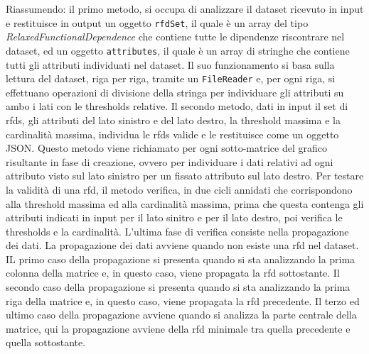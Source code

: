 Riassumendo: il primo metodo, si occupa di analizzare il dataset ricevuto in input e restituisce in output un oggetto \texttt{rfdSet}, il quale \`{e} un array del tipo \textit{RelaxedFunctionalDependence} che contiene tutte le dipendenze riscontrare nel dataset, ed un oggetto \texttt{attributes}, il quale \`{e} un array di stringhe che contiene tutti gli attributi individuati nel dataset. Il suo funzionamento si basa sulla lettura del dataset, riga per riga, tramite un \texttt{FileReader} e, per ogni riga, si effettuano operazioni di divisione della stringa per individuare gli attributi su ambo i lati con le thresholds relative. Il secondo metodo, dati in input il set di \acrshort{rfds}, gli attributi del lato sinistro e del lato destro, la threshold massima e la cardinalit\`{a} massima, individua le \acrshort{rfds} valide e le restituisce come un oggetto JSON. Questo metodo viene richiamato per ogni sotto-matrice del grafico risultante in fase di creazione, ovvero per individuare i dati relativi ad ogni attributo visto sul lato sinistro per un fissato attributo sul lato destro. Per testare la validit\`{a} di una \acrshort{rfd}, il metodo verifica, in due cicli annidati che corrispondono alla threshold massima ed alla cardinalit\`{a} massima, prima che questa contenga gli attributi indicati in input per il lato sinitro e per il lato destro, poi verifica le thresholds e la cardinalit\`{a}. L'ultima fase di verifica consiste nella propagazione dei dati. La propagazione dei dati avviene quando non esiste una \acrshort{rfd} nel dataset. IL primo caso della propagazione si presenta quando si sta analizzando la prima colonna della matrice e, in questo caso, viene propagata la \acrshort{rfd} sottostante. Il secondo caso della propagazione si presenta quando si sta analizzando la prima riga della matrice e, in questo caso, viene propagata la \acrshort{rfd} precedente. Il terzo ed ultimo caso della propagazione avviene quando si analizza la parte centrale della matrice, qui la propagazione avviene della \acrshort{rfd} minimale tra quella precedente e quella sottostante.

